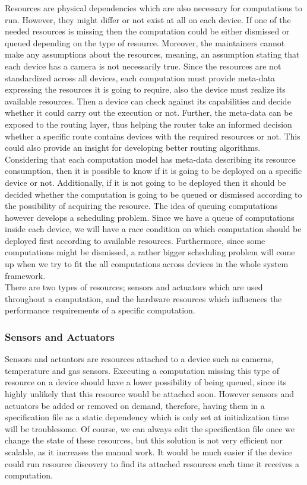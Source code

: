 Resources are physical dependencies which are also necessary for computations to run. However, they might differ or not exist at all on each device. If one of the needed resources is missing then the computation could be either dismissed or queued depending on the type of resource. Moreover, the maintainers cannot make any assumptions about the resources, meaning, an assumption stating that each device has a camera is not necessarily true. Since the resources are not standardized across all devices, each computation must provide meta-data expressing the resources it is going to require, also the device must realize its available resources. Then a device can check against its capabilities and decide whether it could carry out the execution or not. Further, the meta-data can be exposed to the routing layer, thus helping the router take an informed decision whether a specific route contains devices with the required resources or not. This could also provide an insight for developing better routing algorithms.\\

 \noindent Considering that each computation model has meta-data describing its resource consumption, then it is possible to know if it is going to be deployed on a specific device or not. Additionally, if it is not going to be deployed then it should be decided whether the computation is going to be queued or dismissed according to the possibility of acquiring the resource. The idea of queuing computations however develops a scheduling problem. Since we have a queue of computations inside each device, we will have a race condition on which computation should be deployed first according to available resources. Furthermore, since some computations might be dismissed, a rather bigger scheduling problem will come up when we try to fit the all computations across devices in the whole system framework.\\

  \noindent There are two types of resources; sensors and actuators which are used throughout a computation, and the hardware resources which influences the performance requirements of a specific computation.


\subsubsection{Sensors and Actuators}

  Sensors and actuators are resources attached to a device such as cameras, temperature and gas sensors. Executing a computation missing this type of resource on a device should have a lower possibility of being queued, since its highly unlikely that this resource would be attached soon. However sensors and actuators be added or removed on demand, therefore, having them in a specification file as a static dependency which is only set at initialization time will be troublesome. Of course, we can always edit the specification file once we change the state of these resources, but this solution is not very efficient nor scalable, as it increases the manual work. It would be much easier if the device could run resource discovery to find its attached resources each time it receives a computation. \\
  
